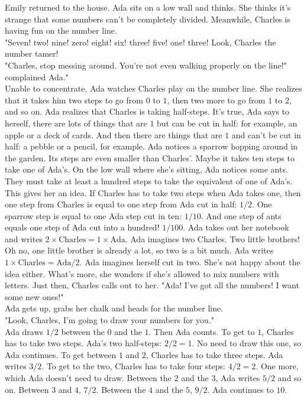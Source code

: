 Emily returned to the house. 
Ada sits on a low wall and thinks. 
She thinks it's strange that some numbers can't be completely divided. 
Meanwhile, Charles is having fun on the number line. \\
"Seven! two! nine! zero! eight! six! three! five! one! three! Look, Charles the number tamer! \\
"Charles, stop messing around. You're not even walking properly on the line!" complained Ada." \\
Unable to concentrate, Ada watches Charles play on the number line. She realizes that it takes him two steps to go from $0$ to $1$, then two more to go from $1$ to $2$, and so on. Ada realizes that Charles is taking half-steps. 
It's true, Ada says to herself, there are lots of things that are $1$ but can be cut in half: for example, an apple or a deck of cards. And then there are things that are $1$ and can't be cut in half: a pebble or a pencil, for example.
Ada notices a sparrow hopping around in the garden. Its steps are even smaller than Charles'. Maybe it takes ten steps to take one of Ada's. On the low wall where she's sitting, Ada notices some ants. They must take at least a hundred steps to take the equivalent of one of Ada's. This gives her an idea.
If Charles has to take two steps when Ada takes one, then one step from Charles is equal to one step from Ada cut in half: $1/2$. One sparrow step is equal to one Ada step cut in ten: $1/10$. And one step of ants equals one step of Ada cut into a hundred! $1/100$.
Ada takes out her notebook and writes $2 \times \mathrm{Charles} = 1 \times \mathrm{Ada}$. Ada imagines two Charles. Two little brothers! Oh no, one little brother is already a lot, so two is a bit much. Ada writes $1 \times \mathrm{Charles} = \mathrm{Ada} / 2$. Ada imagines herself cut in two. She's not happy about the idea either. What's more, she wonders if she's allowed to mix numbers with letters.
Just then, Charles calls out to her.
"Ada! I've got all the numbers! I want some new ones!" \\
Ada gets up, grabs her chalk and heads for the number line.\\
"Look, Charles, I'm going to draw your numbers for you." \\
Ada draws $1/2$ between the $0$ and the $1$. Then Ada counts. To get to $1$, Charles has to take two steps. Ada's two half-steps: $2/2 = 1$. No need to draw this one, so Ada continues. To get between $1$ and $2$, Charles has to take three steps. Ada writes $3/2$. To get to the two, Charles has to take four steps: $4/2 = 2$. One more, which Ada doesn't need to draw. Between the $2$ and the $3$, Ada writes $5/2$ and so on. Between $3$ and $4$, $7/2$. Between the $4$ and the $5$, $9/2$. Ada continues to $10$. 
